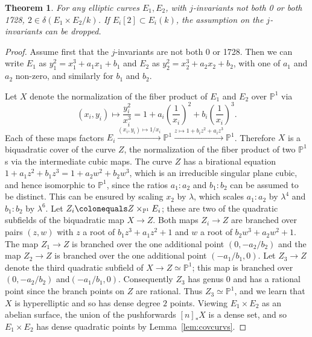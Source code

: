 \documentclass[a4paper,11pt]{amsart}
\theoremstyle{plain}
\newtheorem{thm}{Theorem}[section]
\theoremstyle{remark}
\renewcommand{\P}{\mathbb{P}}
\newcommand{\pp}{\mathbb{P}}
\newcommand{\dendegs}{\delta}
\begin{document}
\begin{thm}\label{Ec w/o bad j-invariant}
    For any elliptic curves $E_1, E_2$, with $j$-invariants not both 0 or both 1728,
    $2 \in \dendegs(E_1 \times E_2 / k)$. If $E_i[2]\subset E_i(k)$, the assumption on the $j$-invariants can be dropped. 
\end{thm}
\begin{proof} Assume first that the $j$-invariants are not both 0 or 1728. Then we can write $E_1$ as $y_1^2 = x_1^3 + a_1 x_1 + b_1$ and $E_2$ as $y_2^2 = x_2^3 + a_2 x_2 + b_2$, with one of $a_1$ and $a_2$ non-zero, and similarly for $b_1$ and $b_2$. 

Let $X$ denote the normalization of the fiber product of $E_1$ and $E_2$ over \(\P^1\) via  
\[(x_i, y_i) \mapsto \frac{y_i^2}{x_i^3} = 1 + a_i \left(\frac{1}{x_i}\right)^2 + b_i \left(\frac{1}{x_i}\right)^3.\]
Each of these maps factors \(E_i \xrightarrow{(x_i, y_i) \mapsto 1/x_i} \pp^1 \xrightarrow{z \mapsto 1 + b_iz^2 + a_iz^3} \pp^1\).  Therefore \(X\) is a biquadratic cover of the curve \(Z\), the normalization of the fiber product of two $\mathbb{P}^1$s via the intermediate cubic maps. The curve \(Z\) has a birational equation $1 + a_1 z^2 + b_1 z^3 = 1 + a_2 w^2 + b_2 w^3$, which is an irreducible singular plane cubic, and hence isomorphic to \(\pp^1\), since the ratios $a_1 : a_2$ and $b_1 : b_2$ can be assumed to be distinct. This can be ensured by scaling $x_2$ by $\lambda$, which scales $a_1 : a_2$ by $\lambda^4$ and $b_1 : b_2$ by $\lambda^6$.
Let \(Z_i \colonequals Z \times_{\pp^1} E_i\); these are two of the quadratic subfields of the biquadratic map \(X \to Z\).  Both maps \(Z_i \to Z\) are branched over pairs \((z, w)\) with \(z\) a root of \(b_1z^3 + a_1z^2 + 1\) and \(w\) a root of \(b_2w^3 + a_2w^2 + 1\).  The map \(Z_1 \to Z\) is branched over the one additional point \((0, -a_2/b_2)\) and the map \(Z_2 \to Z\) is branched over the one additional point \((-a_1/b_1, 0)\).  Let \(Z_3 \to Z\) denote the third quadratic subfield of \(X \to Z \simeq \pp^1\); this map is branched over \((0, -a_2/b_2)\) and\((-a_1/b_1, 0)\).  Consequently \(Z_3\) has genus \(0\) and has a rational point since the branch points on \(Z\) are rational.  Thus \(Z_3 \simeq \pp^1\), and we learn that \(X\) is hyperelliptic and so has dense degree \(2\) points.
Viewing $E_1 \times E_2$ as an abelian surface, the union of the pushforwards $[n]_* X$ is a dense set, and so $E_1 \times E_2$ has dense quadratic points by Lemma~\ref{lem:covcurvs}.


\end{proof}
\end{document}
